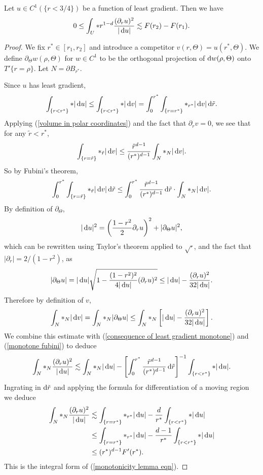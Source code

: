 \begin{lemma}\label{monotonicity lemma}
Let $u \in C^1(\{r < 3/4\})$ be a function of least gradient. Then we have
\begin{equation}\label{monotonicity lemma eqn}0 \leq \int_U *r^{1 - d}\frac{(\partial_ru)^2}{|\mathop{}\!\mathrm{d} u|} \lesssim F(r_2) - F(r_1).\end{equation}
\end{lemma}
\begin{proof}
We fix $r^* \in [r_1, r_2]$ and introduce a competitor $v(r, \Theta) = u(r^*, \Theta)$. We define $\partial_\Theta w(\rho, \Theta)$ for $w \in C^1$ to be the orthogonal projection of $\mathop{}\!\mathrm{d} w(\rho, \Theta)$ onto $T'\{r = \rho\}$.
Let $N = \partial B_{r^*}$.

Since $u$ has least gradient,
\begin{equation}\label{consequence of least gradient monotone}
    \int_{\{r < r^*\}} *|\mathop{}\!\mathrm{d} u| \leq \int_{\{r < r^*\}} *|\mathop{}\!\mathrm{d} v| = \int_0^{r^*} \int_{\{r = r^*\}} *_{r^*} |\mathop{}\!\mathrm{d} v| \mathop{}\!\mathrm{d} \tilde r.
\end{equation}
Applying (\ref{volume in polar coordinates}) and the fact that $\partial_r v = 0$, we see that for any $\tilde r < r^*$,
$$\int_{\{r = \tilde r\}} *_{\tilde r} |\mathop{}\!\mathrm{d} v| \leq \frac{\tilde r^{d - 1}}{(r^*)^{d - 1}} \int_N *_N |\mathop{}\!\mathrm{d} v|.$$
So by Fubini's theorem,
\begin{equation}\label{monotone fubini}
    \int_0^{r^*} \int_{\{r = \tilde r\}} *_{\tilde r} |\mathop{}\!\mathrm{d} v| \mathop{}\!\mathrm{d} \tilde r \leq \int_0^{r^*} \frac{\tilde r^{d - 1}}{(r^*)^{d - 1}} \mathop{}\!\mathrm{d} \tilde r \cdot \int_N *_N |\mathop{}\!\mathrm{d} v|.
\end{equation}
By definition of $\partial_\Theta$,
$$|\mathop{}\!\mathrm{d} u|^2 = \left(\frac{1 - r^2}{2} \partial_r u\right)^2 + |\partial_\Theta u|^2,$$
which can be rewritten using Taylor's theorem applied to $\sqrt\cdot$, and the fact that $|\partial_r| = 2/(1 - r^2)$, as
$$|\partial_\Theta u| = |\mathop{}\!\mathrm{d} u|\sqrt{1 - \frac{(1 - r^2)^2}{4|\mathop{}\!\mathrm{d} u|} (\partial_r u)^2} \leq |\mathop{}\!\mathrm{d} u| - \frac{(\partial_r u)^2}{32 |\mathop{}\!\mathrm{d} u|}.$$
Therefore by definition of $v$,
\begin{align*}
\int_N *_N |\mathop{}\!\mathrm{d} v| = \int_N *_N |\partial_\Theta u| \leq \int_N *_N\left[|\mathop{}\!\mathrm{d} u| - \frac{(\partial_ru)^2}{32 |\mathop{}\!\mathrm{d} u|}\right].
\end{align*}
We combine this estimate with (\ref{consequence of least gradient monotone}) and (\ref{monotone fubini}) to deduce
$$\int_N *_N \frac{(\partial_ru)^2}{|\mathop{}\!\mathrm{d} u|} \lesssim \int_N *_N |\mathop{}\!\mathrm{d} u| - \left[\int_0^{r^*} \frac{\tilde r^{d - 1}}{(r^*)^{d - 1}} \mathop{}\!\mathrm{d} \tilde r\right]^{-1} \int_{\{r < r^*\}} *|\mathop{}\!\mathrm{d} u|.$$
Ingrating in $\mathop{}\!\mathrm{d} \tilde r$ and applying the formula for differentiation of a moving region we deduce 
\begin{align*}
\int_N *_N \frac{(\partial_ru)^2}{|\mathop{}\!\mathrm{d} u|}
&\lesssim \int_{\{r = r^*\}} *_{r^*} |\mathop{}\!\mathrm{d} u| - \frac{d}{r^*} \int_{\{r < r^*\}} *|\mathop{}\!\mathrm{d} u| \\
&\leq \int_{\{r = r^*\}} *_{r^*} |\mathop{}\!\mathrm{d} u| - \frac{d - 1}{r^*} \int_{\{r < r^*\}} *|\mathop{}\!\mathrm{d} u| \\
&\leq (r^*)^{d - 1} F'(r^*).
\end{align*}
This is the integral form of (\ref{monotonicity lemma eqn}).
\end{proof}

